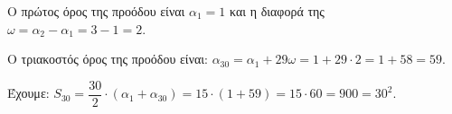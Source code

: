 
\begin{alist}
\item 
\begin{rlist}
\item Ο πρώτος όρος της προόδου είναι $\alpha_1 = 1$ και η διαφορά της $\omega = \alpha_2 - \alpha_1 = 3 - 1 = 2$.
\item Ο τριακοστός όρος της προόδου είναι: $\alpha_{30} = \alpha_1 + 29\omega = 1 + 29 \cdot 2 = 1 + 58 = 59$.
\end{rlist}

\item Έχουμε: $S_{30} = \dfrac{30}{2} \cdot (\alpha_1 + \alpha_{30}) = 15 \cdot (1 + 59) = 15 \cdot 60 = 900 = 30^2$.
\end{alist}

